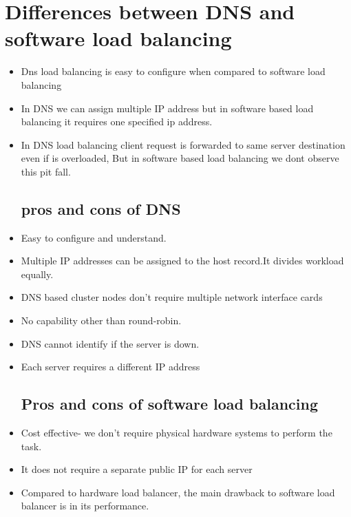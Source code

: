 \section{Differences between DNS and software load balancing}
\begin{itemize}
\item Dns load balancing is easy to configure when compared to software load balancing 
\item In DNS we can assign multiple IP address but in software based load balancing it requires one specified ip address.
\item In DNS load balancing client request is forwarded to same server destination even if is overloaded, But in software based load balancing we dont observe this pit fall.

\subsection{pros and cons of DNS}

\item Easy to configure and understand.
\item Multiple IP addresses can be assigned to the host   record.It divides workload equally.
\item DNS based cluster nodes don’t require multiple network interface cards

\item No capability other than round-robin.
\item DNS cannot identify if the server is down.
\item Each server requires a different IP address

\subsection{Pros and cons of software load balancing}

\item Cost effective- we don't require physical hardware systems to perform the task.
\item It does not require a separate public IP for each server 

\item Compared to hardware load balancer, the main drawback to software load balancer is in its performance.

\end{itemize}
